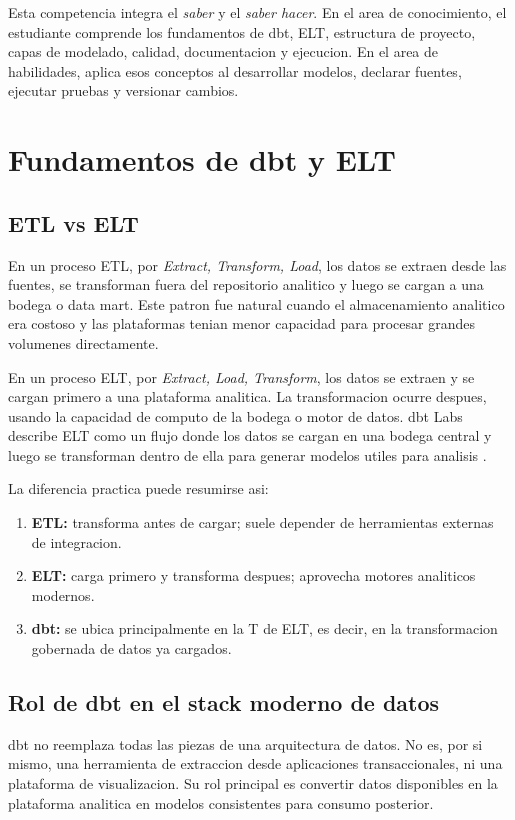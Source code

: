 \documentclass[12pt]{article}
\begin{document}
Esta competencia integra el \textit{saber} y el \textit{saber hacer}. En el area de conocimiento, el estudiante comprende los fundamentos de dbt, ELT, estructura de proyecto, capas de modelado, calidad, documentacion y ejecucion. En el area de habilidades, aplica esos conceptos al desarrollar modelos, declarar fuentes, ejecutar pruebas y versionar cambios.

\section{Fundamentos de dbt y ELT}
\subsection{ETL vs ELT}
En un proceso ETL, por \textit{Extract, Transform, Load}, los datos se extraen desde las fuentes, se transforman fuera del repositorio analitico y luego se cargan a una bodega o data mart. Este patron fue natural cuando el almacenamiento analitico era costoso y las plataformas tenian menor capacidad para procesar grandes volumenes directamente.

En un proceso ELT, por \textit{Extract, Load, Transform}, los datos se extraen y se cargan primero a una plataforma analitica. La transformacion ocurre despues, usando la capacidad de computo de la bodega o motor de datos. dbt Labs describe ELT como un flujo donde los datos se cargan en una bodega central y luego se transforman dentro de ella para generar modelos utiles para analisis \cite{dbt_elt_pipeline}.

La diferencia practica puede resumirse asi:

\begin{enumerate}[label=\textbf{E\arabic*.}, leftmargin=*]
\item \textbf{ETL:} transforma antes de cargar; suele depender de herramientas externas de integracion.
\item \textbf{ELT:} carga primero y transforma despues; aprovecha motores analiticos modernos.
\item \textbf{dbt:} se ubica principalmente en la T de ELT, es decir, en la transformacion gobernada de datos ya cargados.
\end{enumerate}

\subsection{Rol de dbt en el stack moderno de datos}
dbt no reemplaza todas las piezas de una arquitectura de datos. No es, por si mismo, una herramienta de extraccion desde aplicaciones transaccionales, ni una plataforma de visualizacion. Su rol principal es convertir datos disponibles en la plataforma analitica en modelos consistentes para consumo posterior.
\end{document}
